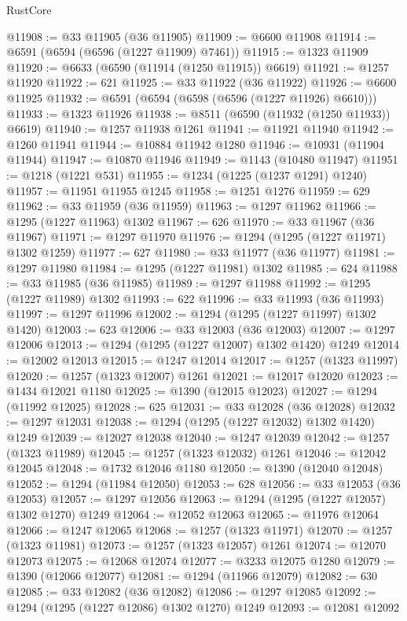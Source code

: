 \begin{lexlean}{RustCore}
\begin{coremodule}
@11908 := @33 @11905 (@36 @11905)
@11909 := @6600 @11908
@11914 := @6591 (@6594 (@6596 (@1227 @11909) @7461))
@11915 := @1323 @11909
@11920 := @6633 (@6590 (@11914 (@1250 @11915)) @6619)
@11921 := @1257 @11920
@11922 := 621
@11925 := @33 @11922 (@36 @11922)
@11926 := @6600 @11925
@11932 := @6591 (@6594 (@6598 (@6596 (@1227 @11926) @6610)))
@11933 := @1323 @11926
@11938 := @8511 (@6590 (@11932 (@1250 @11933)) @6619)
@11940 := @1257 @11938 @1261
@11941 := @11921 @11940
@11942 := @1260 @11941
@11944 := @10884 @11942 @1280
@11946 := @10931 (@11904 @11944)
@11947 := @10870 @11946
@11949 := @1143 (@10480 @11947)
@11951 := @1218 (@1221 @531)
@11955 := @1234 (@1225 (@1237 @1291) @1240)
@11957 := @11951 @11955 @1245
@11958 := @1251 @1276
@11959 := 629
@11962 := @33 @11959 (@36 @11959)
@11963 := @1297 @11962
@11966 := @1295 (@1227 @11963) @1302
@11967 := 626
@11970 := @33 @11967 (@36 @11967)
@11971 := @1297 @11970
@11976 := @1294 (@1295 (@1227 @11971) @1302 @1259)
@11977 := 627
@11980 := @33 @11977 (@36 @11977)
@11981 := @1297 @11980
@11984 := @1295 (@1227 @11981) @1302
@11985 := 624
@11988 := @33 @11985 (@36 @11985)
@11989 := @1297 @11988
@11992 := @1295 (@1227 @11989) @1302
@11993 := 622
@11996 := @33 @11993 (@36 @11993)
@11997 := @1297 @11996
@12002 := @1294 (@1295 (@1227 @11997) @1302 @1420)
@12003 := 623
@12006 := @33 @12003 (@36 @12003)
@12007 := @1297 @12006
@12013 := @1294 (@1295 (@1227 @12007) @1302 @1420) @1249
@12014 := @12002 @12013
@12015 := @1247 @12014
@12017 := @1257 (@1323 @11997)
@12020 := @1257 (@1323 @12007) @1261
@12021 := @12017 @12020
@12023 := @1434 @12021 @1180
@12025 := @1390 (@12015 @12023)
@12027 := @1294 (@11992 @12025)
@12028 := 625
@12031 := @33 @12028 (@36 @12028)
@12032 := @1297 @12031
@12038 := @1294 (@1295 (@1227 @12032) @1302 @1420) @1249
@12039 := @12027 @12038
@12040 := @1247 @12039
@12042 := @1257 (@1323 @11989)
@12045 := @1257 (@1323 @12032) @1261
@12046 := @12042 @12045
@12048 := @1732 @12046 @1180
@12050 := @1390 (@12040 @12048)
@12052 := @1294 (@11984 @12050)
@12053 := 628
@12056 := @33 @12053 (@36 @12053)
@12057 := @1297 @12056
@12063 := @1294 (@1295 (@1227 @12057) @1302 @1270) @1249
@12064 := @12052 @12063
@12065 := @11976 @12064
@12066 := @1247 @12065
@12068 := @1257 (@1323 @11971)
@12070 := @1257 (@1323 @11981)
@12073 := @1257 (@1323 @12057) @1261
@12074 := @12070 @12073
@12075 := @12068 @12074
@12077 := @3233 @12075 @1280
@12079 := @1390 (@12066 @12077)
@12081 := @1294 (@11966 @12079)
@12082 := 630
@12085 := @33 @12082 (@36 @12082)
@12086 := @1297 @12085
@12092 := @1294 (@1295 (@1227 @12086) @1302 @1270) @1249
@12093 := @12081 @12092

\end{coremodule}
\end{lexlean}
